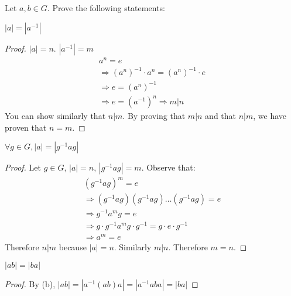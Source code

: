 \documentclass[class=scrartcl, crop=false]{standalone}
\begin{document}
\begin{example}
  Let $a, b \in G$. Prove the following statements:
  \begin{enumerate}[label=(\alph*)]
    \ii
    $|a| = |a^{-1}|$ 
    \begin{proof}
      $|a| = n$. $|a^{-1}| = m$
      \begin{gather*}
        a^n = e \\
        \Rightarrow (a^n)^{-1} \cdot a^n = (a^n)^{-1} \cdot e \\
        \Rightarrow e = (a^n)^{-1} \\
        \Rightarrow e = (a^{-1})^n
        \Rightarrow m | n
      \end{gather*}
      You can show similarly that $n | m$. By proving that $m | n$ and that $n | m$, we have proven that $n = m$.
    \end{proof}
    \ii
    $\forall g \in G, |a| = |g^{-1}ag|$ 
    \begin{proof}
      Let $g \in G$, $|a| = n$, $|g^{-1}ag| = m$. Observe that:
      \begin{gather*}
        (g^{-1}ag)^m = e \\
        \Rightarrow (g^{-1}ag)(g^{-1}ag)\dots(g^{-1}ag) = e \\
        \Rightarrow g^{-1}a^mg = e \\
        \Rightarrow g \cdot g^{-1} a^m g \cdot g^{-1} = g \cdot e \cdot g^{-1} \\
        \Rightarrow a^m = e
      \end{gather*}
      Therefore $n | m$ because $|a| = n$. Similarly $m | n$. Therefore $m = n$.
    \end{proof}
    \ii
    $|ab| = |ba|$ 
    \begin{proof}
      By (b), $|ab| = |a^{-1}(ab)a| = |a^{-1}aba| = |ba|$
    \end{proof}
  \end{enumerate}
\end{example}
\end{document}

